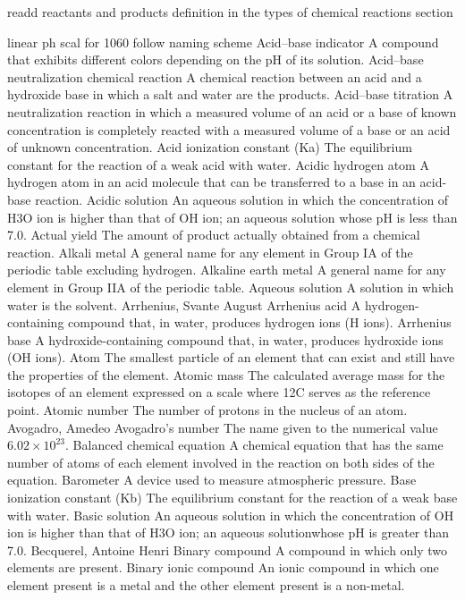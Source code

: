 \documentclass[10pt, roman]{article}
\begin{document}
readd reactants and products definition in the types of chemical reactions section


linear ph scal for 1060 
follow naming scheme
Acid–base indicator A compound that exhibits different colors depending on the pH of its solution.
Acid–base neutralization chemical reaction A chemical reaction between an acid and a hydroxide base in which a salt and water are the products.
Acid–base titration A neutralization reaction in which a measured volume of an acid or a base of known concentration is completely reacted with a measured volume of a base or an acid of unknown concentration.
Acid ionization constant (Ka) The equilibrium constant for the reaction of a weak acid with water.
Acidic hydrogen atom A hydrogen atom in an acid molecule that can be transferred to a base in an acid-base reaction.
Acidic solution An aqueous solution in which the concentration of H3O ion is higher than that of OH ion; an aqueous solution whose pH is less than 7.0.
Actual yield The amount of product actually obtained from a chemical reaction.
Alkali metal A general name for any element in Group IA of the periodic table excluding hydrogen.
Alkaline earth metal A general name for any element in Group IIA of the periodic table.
Aqueous solution A solution in which water is the solvent.
Arrhenius, Svante August
Arrhenius acid A hydrogen-containing compound that, in water, produces hydrogen ions (H ions).
Arrhenius base A hydroxide-containing compound that, in water, produces hydroxide ions (OH ions).
Atom The smallest particle of an element that can exist and still have the properties of the element.
Atomic mass The calculated average mass for the isotopes of an element expressed on a scale where 12C serves as the reference point.
Atomic number The number of protons in the nucleus of an atom.
Avogadro, Amedeo
Avogadro’s number The name given to the numerical value $6.02 \times 10^23$.
Balanced chemical equation A chemical equation that has the same number of atoms of each element involved in the reaction on both sides of the equation.
Barometer A device used to measure atmospheric pressure.
Base ionization constant (Kb) The equilibrium constant for the reaction of a weak base with water.
Basic solution An aqueous solution in which the concentration of OH ion is higher than that of H3O ion; an aqueous solutionwhose pH is greater than 7.0.
Becquerel, Antoine Henri
Binary compound A compound in which only two elements are present.
Binary ionic compound An ionic compound in which one element present is a metal and the other element present is a non-metal.
\end{document}
